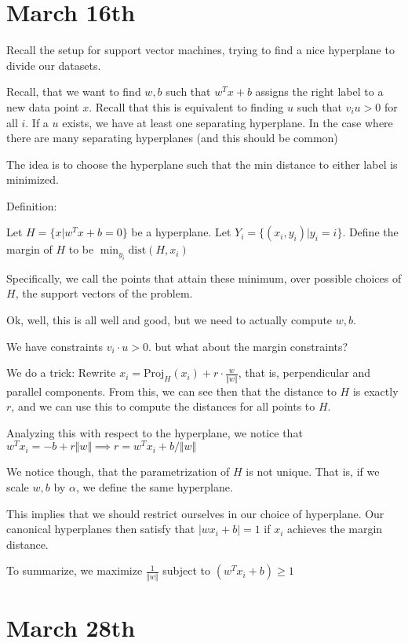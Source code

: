 \documentclass[10pt]{article}
\begin{document}
\section*{March 16th}

 Recall the setup for support vector machines, trying to find a nice hyperplane to divide our datasets.
 
 Recall, that we want to find $w,b$ such that $w^Tx + b$ assigns the right label to a new data point $x$. Recall that this is equivalent to finding $u$ such that $v_i u > 0$ for all $i$. If a $u$ exists, we have at least one separating hyperplane. In the case where there are many separating hyperplanes (and this should be common)
 
 The idea is to choose the hyperplane such that the min distance to either label is minimized.
 
 Definition:
 
 Let $H = \{ x | w^T x + b = 0 \}$ be a hyperplane. Let $Y_i = \{ (x_i, y_i) | y_i = i \}$. Define the margin of $H$ to be $\min_{y_i} \text{dist}(H,x_i)$
 
 Specifically, we call the points that attain these minimum, over possible choices of $H$, the support vectors of the problem.
 
 Ok, well, this is all well and good, but we need to actually compute $w,b$. 
 
 We have constraints $v_i \cdot u > 0$. but what about the margin constraints?
 
 We do a trick: Rewrite $x_i = \text{Proj}_H(x_i) + r \cdot \frac{w}{\Vert w \Vert} $, that is, perpendicular and parallel components. From this, we can see then that the distance to $H$ is exactly $r$, and we can use this to compute the distances for all points to $H$.
 
Analyzing this with respect to the hyperplane, we notice that $w^T x_i = -b  + r \Vert w \Vert \implies r = w^T x_i + b/\Vert w \Vert$

We notice though, that the parametrization of $H$ is not unique. That is, if we scale $w, b$ by $\alpha$, we define the same hyperplane. 

This implies that we should restrict ourselves in our choice of hyperplane. Our canonical hyperplanes then satisfy that $|wx_i + b| = 1$ if $x_i$ achieves the margin distance.

To summarize, we maximize $\frac{1}{\Vert w \Vert}$ subject to $(w^T x_i + b) \geq 1$

\section*{March 28th}
\end{document}
